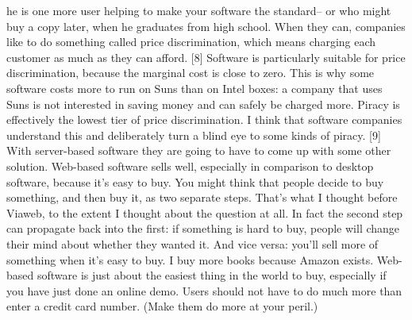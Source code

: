 he is one more user helping to make your software the standard--
or who might buy a copy later, when he graduates from high school.
When they can, companies like to do something called price
discrimination, which means charging each customer as much as they
can afford. [8] Software is particularly suitable for price
discrimination, because the marginal cost is close to zero.  This
is why some software costs more to run on Suns than on Intel boxes:
a company that uses Suns is not interested in saving money and can
safely be charged more.  Piracy is effectively the lowest tier of
price discrimination.  I think that software companies understand
this and deliberately turn a blind eye to some kinds of piracy. [9] 
With server-based software they are going to have to come up with 
some other solution.
Web-based software sells well, especially in comparison to desktop
software, because it's easy to buy.  You might think that people
decide to buy something, and then buy it, as two separate steps.
That's what I thought before Viaweb, to the extent I thought about
the question at all.  In fact the second step can propagate back
into the first: if something is hard to buy, people will change
their mind about whether they wanted it.  And vice versa: you'll
sell more of something when it's easy to buy.  I buy more books
because Amazon exists.  Web-based software is just about the easiest
thing in the world to buy, especially if you have just done an
online demo.  Users should not have to do much more than enter a
credit card number.  (Make them do more at your peril.)

